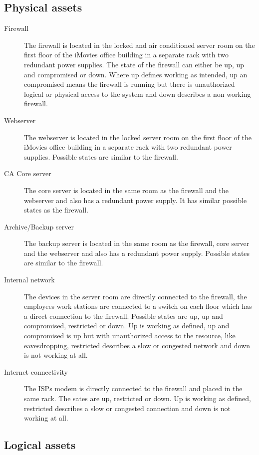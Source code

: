 \documentclass[a4paper, toc=index, 12pt, DIV14, twoside, BCOR2cm, headsepline, numbers=noenddot, bibliography=totoc]{scrbook}
\begin{document}
\subsection{Physical assets}
\begin{description}
\item[Firewall ] The firewall is located in the locked and air conditioned server room on the first floor of the iMovies office building in a separate rack with two redundant power supplies. The state of the firewall can either be up, up and compromised or down. Where up defines working as intended, up an compromised means the firewall is running but there is unauthorized logical or physical access to the system and down describes a non working firewall.
\item[Webserver ] The webserver is located in the locked server room on the first floor of the iMovies office building in a separate rack with two redundant power supplies. Possible states are similar to the firewall.
\item[CA Core server ] The core server is located in the same room as the firewall and the webserver and also has a redundant power supply. It has similar possible states as the firewall.
\item[Archive/Backup server ] The backup server is located in the same room as the firewall, core server and the webserver and also has a redundant power supply. Possible states are similar to the firewall.
\item[Internal network ] The devices in the server room are directly connected to the firewall, the employees work stations are connected to a switch on each floor which has a direct connection to the firewall. Possible states are up, up and compromised, restricted or down. Up is working as defined, up and compromised is up but with unauthorized access to the resource, like eavesdropping, restricted describes a slow or congested network and down is not working at all.
\item[Internet connectivity ] The ISPs modem is directly connected to the firewall and placed in the same rack. The sates are up, restricted or down. Up is working as defined, restricted describes a slow or congested connection and down is not working at all.
\end{description}

\subsection{Logical assets}
\end{document}
